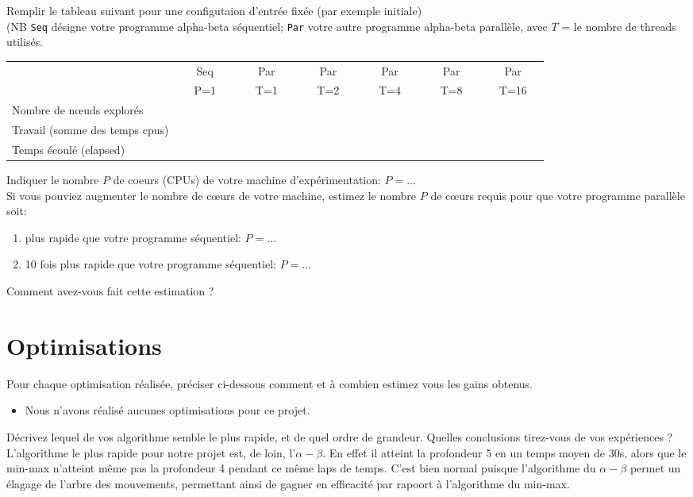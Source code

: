 \documentclass[a4paper, 11pt]{article}
\begin{document}
Remplir le tableau suivant pour une  configutaion d'entrée fixée (par exemple initiale)  \\
(NB {\tt Seq} désigne votre programme alpha-beta séquentiel; {\tt Par} votre autre programme alpha-beta parallèle,
avec $T$ = le nombre de threads utilisés. 

\begin{center}
\begin{tabular}{|l||c|c|c|c|c|c||}
\hline
                          & ~~~Seq~~~ & ~~~Par~~~ & ~~~Par~~~ & ~~~Par~~~ & ~~~Par~~~ & ~~~Par~~~   \\
                          & P=1 & T=1  & T=2 & T=4 & T=8 & T=16  \\
\hline
Nombre de n{\oe}uds explorés      & & & & & &  \\
\hline
Travail (somme des temps cpus) & & & & & &  \\
\hline
Temps écoulé (elapsed)         & & & & & & \\
\hline
\end{tabular} 
\end{center}
Indiquer le nombre $P$  de coeurs (CPUs) de votre machine d'expérimentation: $P = \ldots$ \\
Si vous pouviez augmenter le nombre de c{\oe}urs de votre machine, estimez le nombre $P$ de  c{\oe}urs requis pour que votre programme parallèle soit:
\begin{enumerate}
\item plus rapide que votre programme séquentiel: $P=\ldots $
\item 10 fois plus rapide que votre programme séquentiel: $P=\ldots $
\end{enumerate}
Comment avez-vous fait cette estimation ? %

\vspace{3cm}


\section{Optimisations}
Pour chaque optimisation réalisée, préciser ci-dessous comment et à combien estimez vous les
gains obtenus.
\begin{itemize}
\item Nous n'avons réalisé aucunes optimisations pour ce projet.
\end{itemize}
\vspace{1cm}
Décrivez lequel de vos algorithme semble le plus rapide, et de quel ordre de grandeur.
Quelles conclusions tirez-vous de vos expériences ?
\vspace{1cm}
L'algorithme le plus rapide pour notre projet est, de loin, l'$\alpha-\beta$. En effet il atteint la profondeur 5 en un temps moyen de 30s, alors que le min-max n'atteint même pas la profondeur 4 pendant ce même laps de temps. C'est bien normal puisque l'algorithme du $\alpha-\beta$ permet un élagage de l'arbre des mouvements, permettant ainsi de gagner en efficacité par rapoort à l'algorithme du min-max.
\vspace{2cm}
\end{document}
